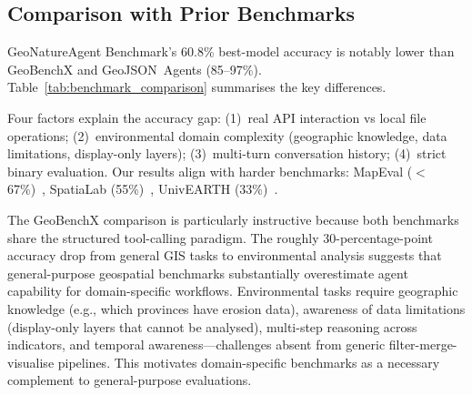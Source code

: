 \documentclass[10pt,twocolumn]{article}
\begin{document}
\subsection{Comparison with Prior Benchmarks}

GeoNatureAgent Benchmark's 60.8\% best-model accuracy is notably lower than GeoBenchX and GeoJSON~Agents (85--97\%). Table~\ref{tab:benchmark_comparison} summarises the key differences.

\begin{table}[t]
\caption{Comparison of structured tool-calling geospatial benchmarks.}
\label{tab:benchmark_comparison}
\centering
\small
{}
\end{table}

Four factors explain the accuracy gap: (1)~real API interaction vs local file operations; (2)~environmental domain complexity (geographic knowledge, data limitations, display-only layers); (3)~multi-turn conversation history; (4)~strict binary evaluation. Our results align with harder benchmarks: MapEval ($<$67\%)~\citep{dihan2025mapeval}, SpatiaLab (55\%)~\citep{wasi2026spatialab}, UnivEARTH (33\%)~\citep{kao2025univearth}.

The GeoBenchX comparison is particularly instructive because both benchmarks share the structured tool-calling paradigm. The roughly 30-percentage-point accuracy drop from general GIS tasks to environmental analysis suggests that general-purpose geospatial benchmarks substantially overestimate agent capability for domain-specific workflows. Environmental tasks require geographic knowledge (e.g., which provinces have erosion data), awareness of data limitations (display-only layers that cannot be analysed), multi-step reasoning across indicators, and temporal awareness---challenges absent from generic filter-merge-visualise pipelines. This motivates domain-specific benchmarks as a necessary complement to general-purpose evaluations.
\end{document}
